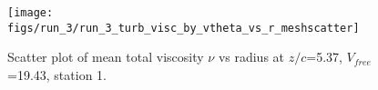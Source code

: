\begin{figure}[H]
\centering
\texttt{[image: figs/run\_3/run\_3\_turb\_visc\_by\_vtheta\_vs\_r\_meshscatter]}
\caption{Scatter plot of mean total viscosity $\nu$ vs radius at $z/c$=5.37, $V_{free}$=19.43, station 1.}
\label{fig:run_3_turb_visc_by_vtheta_vs_r_meshscatter}
\end{figure}



